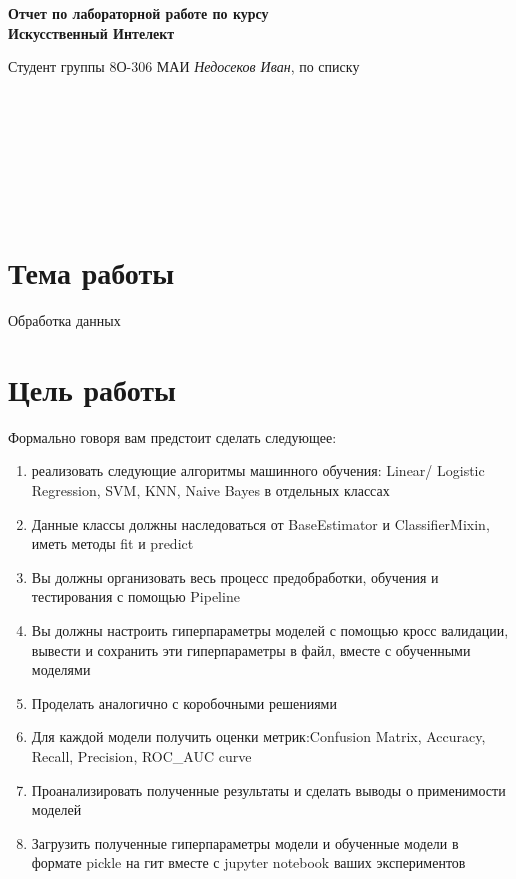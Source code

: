 \documentclass[12pt]{article}
\begin{document}
\begin{center}
	\Large{\textbf{Отчет по лабораторной работе  
		по курсу \\ \guillemotleft Искусственный Интелект\guillemotright}}
	
\end{center}
\begin{flushright}

Студент группы 8О-306 МАИ \textit{Недосеков Иван},  по списку \\
 \\
 \\
\ \\
 \\
 \\
 \\
 \\

\end{flushright}

\section{Тема работы}
Обработка данных

\section{Цель работы}
Формально говоря вам предстоит сделать следующее:
\begin{enumerate}
\item реализовать следующие алгоритмы машинного обучения: Linear/ Logistic Regression, SVM, KNN, Naive Bayes в отдельных классах

\item Данные классы должны наследоваться от BaseEstimator и ClassifierMixin, иметь методы fit и predict 

\item Вы должны организовать весь процесс предобработки, обучения и тестирования с помощью Pipeline 

\item Вы должны настроить гиперпараметры моделей с помощью кросс валидации, вывести и сохранить эти гиперпараметры в файл, вместе с обученными моделями

\item Проделать аналогично с коробочными решениями

\item Для каждой модели получить оценки метрик:Confusion Matrix, Accuracy, Recall, Precision, ROC\_AUC curve 

\item Проанализировать полученные результаты и сделать выводы о применимости моделей

\item Загрузить полученные гиперпараметры модели и обученные модели в формате pickle на гит вместе с jupyter notebook ваших экспериментов

\end{enumerate}
\end{document}
